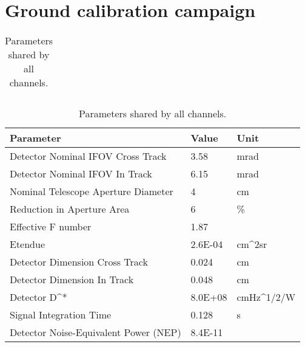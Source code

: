 \section{Ground calibration campaign}

\begin{table}
\begin{tabular}{lll}
\hline
\end{tabular}
\caption{\label{tab:parameters_shared} Parameters shared by all channels.}
\end{table}


\begin{table}
\begin{tabular}{lll}
Parameter & Value & Unit\\
\hline
Detector Nominal IFOV Cross Track & 3.58 & mrad \\
Detector Nominal IFOV In Track & 6.15 & mrad \\
Nominal Telescope Aperture Diameter & 4 & cm\\
Reduction in Aperture Area & 6 & \% \\
Effective F number & 1.87 & \\
Etendue & 2.6E-04 & cm^{2}sr \\
Detector Dimension Cross Track & 0.024 & cm \\
Detector Dimension In Track & 0.048 & cm \\
Detector D^* & 8.0E+08 & cmHz^{1/2}/W \\
Signal Integration Time & 0.128 & s \\
Detector Noise-Equivalent Power (NEP) & 8.4E-11 & \\
\hline
\end{tabular}
\caption{\label{tab:parameters_shared} Parameters shared by all channels.}
\end{table}

